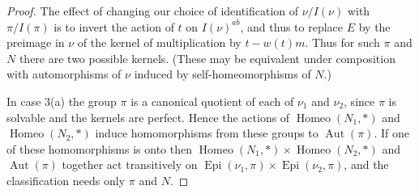 \documentclass[10pt,a4paper]{amsart}
\DeclareMathOperator{\Aut}{Aut}
\DeclareMathOperator{\Epi}{Epi}
\DeclareMathOperator{\Homeo}{Homeo}
\begin{document}
\begin{proof}
The effect of changing our choice of identification of $\nu/I(\nu)$ with $\pi/I(\pi)$
is to invert the action of $t$ on $I(\nu)^{ab}$, and thus to replace
$E$ by the preimage in $\nu$ of the kernel of multiplication by $t-w(t)m$.
Thus for such $\pi$ and $N$ there are two possible kernels.
(These may be equivalent under composition with automorphisms of $\nu$ 
induced by self-homeomorphisms of $N$.)




In case 3(a) the group $\pi$ is a canonical quotient of each of $\nu_1$
and $\nu_2$, since $\pi$ is solvable and the kernels are perfect.
Hence the actions of $\Homeo(N_1,*)$ and $\Homeo(N_2,*)$ induce homomorphisms 
from these groups to $\Aut(\pi)$. 
If one of these homomorphisms is onto then $\Homeo(N_1,*)\times{\Homeo(N_2,*)}$ and   $\Aut(\pi)$ together act transitively on $\Epi(\nu_1,\pi)\times{\Epi(\nu_2,\pi)}$,
and the classification needs only $\pi$ and $N$.  
\end{proof}
\end{document}
